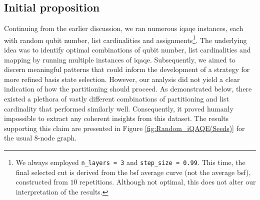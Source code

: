 \subsection*{Initial proposition}
Continuing from the earlier discussion, we ran numerous \acrshort{iqaqe} instances, each with random qubit number, list cardinalities and assignments\footnote{We always employed \texttt{n\_layers = 3} and \texttt{step\_size = 0.99}. This time, the final selected cut is derived from the \acrshort{bsf} average curve (not the average \acrshort{bsf}), constructed from $10$ repetitions. Although not optimal, this does not alter our interpretation of the results.}. The underlying idea was to identify optimal combinations of qubit number, list cardinalities and mapping by running multiple instances of \acrshort{iqaqe}. Subsequently, we aimed to discern meaningful patterns that could inform the development of a strategy for more refined basis state selection. However, our analysis did not yield a clear indication of how the partitioning should proceed. As demonstrated below, there existed a plethora of vastly different combinations of partitioning and list cardinality that performed similarly well. Consequently, it proved humanly impossible to extract any coherent insights from this dataset. The results supporting this claim are presented in Figure \ref{fig:Random_iQAQE(Seeds)} for the usual $8$-node graph.
